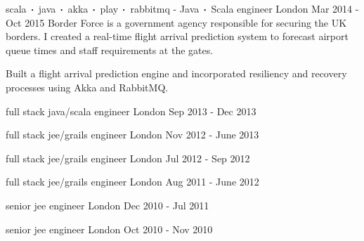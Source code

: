 \begin{cventries}
    \cventry
    {scala$\sqbig$java$\sqbig$akka$\sqbig$play$\sqbig$rabbitmq}
    { - Java$\sqbig$Scala engineer}
    {London}
    {Mar 2014 - Oct 2015}
    {Border Force is a government agency responsible for securing the UK borders. I created a real-time flight arrival prediction system to forecast airport queue times and staff requirements at the gates.}
    {
        \begin{cvitems}
            \item{Built a flight arrival prediction engine and incorporated resiliency and recovery processes using Akka and RabbitMQ.}
        \end{cvitems}
    }

    \cventry
    {full stack java/scala engineer}
    {}
    {London}
    {Sep 2013 - Dec 2013}
    {}
    {}

    \cventry
    {full stack jee/grails engineer}
    {}
    {London}
    {Nov 2012 - June 2013}
    {}
    {}

    \cventry
    {full stack jee/grails engineer}
    {}
    {London}
    {Jul 2012 - Sep 2012}
    {}
    {}

    \cventry
    {full stack jee/grails engineer}
    {}
    {London}
    {Aug 2011 - June 2012}
    {}
    {}

    \cventry
    {senior jee engineer}
    {}
    {London}
    {Dec 2010 - Jul 2011}
    {}
    {}

    \cventry
    {senior jee engineer}
    {}
    {London}
    {Oct 2010 - Nov 2010}
    {}
    {}
\end{cventries}


